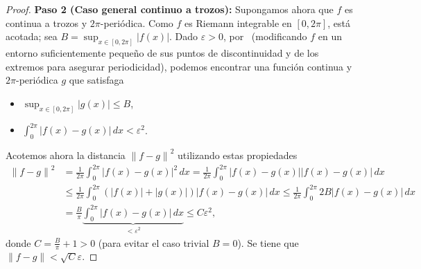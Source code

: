 \documentclass[12pt]{article}
\theoremstyle{plain}
\theoremstyle{definition}
\numberwithin{equation}{section}
\begin{document}
\begin{proof}
                \textbf{Paso 2 (Caso general continuo a trozos):} Supongamos ahora que \(f\) es continua a trozos y \(2\pi\)-periódica. Como \(f\) es Riemann integrable en \([0,2\pi]\), está acotada; sea \(B = \sup_{x \in [0,2\pi]} \lvert f(x) \rvert\). Dado \(\varepsilon > 0\), por~\cite[Chapter 8, Theorem 8.15, Theorem 8.16]{Rudin} (modificando \(f\) en un entorno suficientemente pequeño de sus puntos de discontinuidad y de los extremos para asegurar periodicidad), podemos encontrar una función continua y \(2\pi\)-periódica \(g\) que satisfaga
                \begin{itemize}
                    \item \(\sup_{x \in [0,2\pi]} \left\lvert g(x)\right\rvert \leq B\),
                    \item \(\int_{0}^{2\pi} \left\lvert f(x) - g(x)\right\rvert \,dx < \varepsilon^2\).
                \end{itemize}
                Acotemos ahora la distancia \(\left\lVert f - g\right\rVert^2\) utilizando estas propiedades
                \begin{align*}
                    \left\lVert f - g\right\rVert^2 &= \frac{1}{2\pi} \int_{0}^{2\pi} \left\lvert f(x) - g(x)\right\rvert^2 \,dx = \frac{1}{2\pi} \int_{0}^{2\pi} \left\lvert f(x) - g(x)\right\rvert \left\lvert f(x) - g(x)\right\rvert \,dx \\
                    &\leq \frac{1}{2\pi} \int_{0}^{2\pi} \left(\left\lvert f(x)\right\rvert + \left\lvert g(x)\right\rvert\right) \left\lvert f(x) - g(x)\right\rvert \,dx \leq \frac{1}{2\pi} \int_{0}^{2\pi} 2B \left\lvert f(x) - g(x)\right\rvert \,dx \\
                    &= \frac{B}{\pi} \underbrace{\int_{0}^{2\pi} \left\lvert f(x) - g(x)\right\rvert \,dx}_{\text{\(< \varepsilon^2\)}} \leq C \varepsilon^2,
                \end{align*}
                donde \(C = \frac{B}{\pi} + 1 > 0\) (para evitar el caso trivial \(B=0\)). Se tiene que \(\left\lVert f - g\right\rVert < \sqrt{C}\varepsilon\).


\end{proof}
\end{document}
